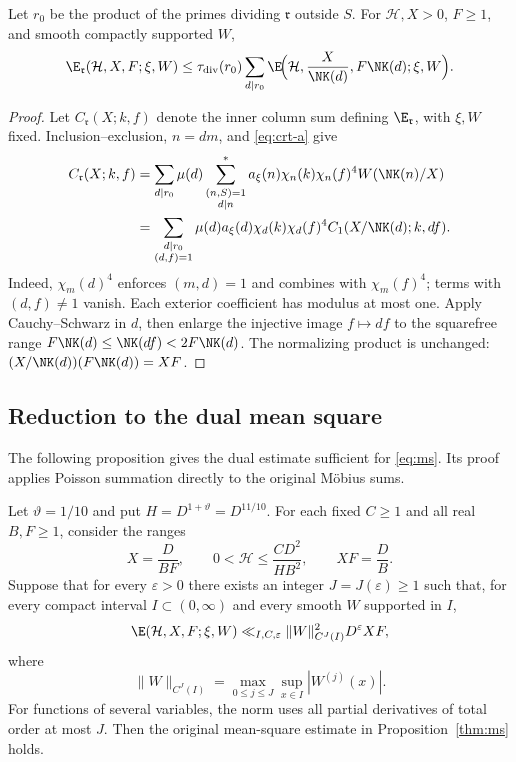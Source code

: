 \begin{lemma}\label{lem:remove-exclusions}
Let $r_0$ be the product of the primes dividing $\mathfrak r$ outside
$S$. For $\mathcal H,X>0$, $F\ge1$, and smooth compactly supported $W$,
\begin{equation}\label{eq:remove-exclusions}
 \E_{\mathfrak r}(\mathcal H,X,F;\xi,W)
 \le\tau_{\mathrm{div}}(r_0)
 \sum_{d\mid r_0}\E\!\Bigl(\mathcal H,\frac X{\NK(d)},F\NK(d);\xi,W\Bigr).
\end{equation}
\end{lemma}
\begin{proof}
Let $C_{\mathfrak r}(X;k,f)$ denote the inner column sum defining
$\E_{\mathfrak r}$, with $\xi,W$ fixed. Inclusion--exclusion,
$n=dm$, and \eqref{eq:crt-a} give
\[
 \begin{aligned}
 C_{\mathfrak r}(X;k,f)
 &=\sum_{d\mid r_0}\mu(d)
   \sum_{\substack{(n,S)=1\\d\mid n}}^*
   a_\xi(n)\chi_n(k)\chi_n(f)^4W(\NK(n)/X)\\
 &=\sum_{\substack{d\mid r_0\\(d,f)=1}}
   \mu(d)a_\xi(d)\chi_d(k)\chi_d(f)^4
   C_1(X/\NK(d);k,df).
 \end{aligned}
\]
Indeed, $\chi_m(d)^4$ enforces $(m,d)=1$ and combines with
$\chi_m(f)^4$; terms with $(d,f)\ne1$ vanish. Each exterior
coefficient has modulus at most one. Apply Cauchy--Schwarz in $d$,
then enlarge the injective image $f\mapsto df$ to the squarefree
range $F\NK(d)\le\NK(df)<2F\NK(d)$. The normalizing product is
unchanged: $(X/\NK(d))(F\NK(d))=XF$.
\end{proof}


\subsection{Reduction to the dual mean square}
The following proposition gives the dual estimate sufficient for
\eqref{eq:ms}. Its proof applies Poisson summation directly to the
original M\"obius sums.

\begin{proposition}\label{prop:poisson-reduction}
Let $\vartheta=1/10$ and put $H=D^{1+\vartheta}=D^{11/10}$.
For each fixed $C\ge1$ and all real $B,F\ge1$, consider the ranges
\begin{equation}\label{eq:initial-scales}
 X=\frac D{BF},\qquad 0<\mathcal{H}\le\frac{CD^2}{HB^2},\qquad
 XF=\frac DB.
\end{equation}
Suppose that for every $\varepsilon>0$ there exists an integer
$J=J(\varepsilon)\ge1$ such that, for every compact interval
$I\subset(0,\infty)$ and every smooth $W$ supported in $I$,
\begin{equation}\label{eq:auxiliary-target}
 \E(\mathcal H,X,F;\xi,W)
 \ll_{I,C,\varepsilon}\|W\|_{C^J(I)}^2D^\varepsilon XF,
\end{equation}
where
\[
 \|W\|_{C^J(I)}=\max_{0\le j\le J}\sup_{x\in I}|W^{(j)}(x)|.
\]
For functions of several variables, the norm uses all partial derivatives
of total order at most $J$.
Then the original mean-square
estimate in Proposition~\ref{thm:ms} holds.
\end{proposition}

